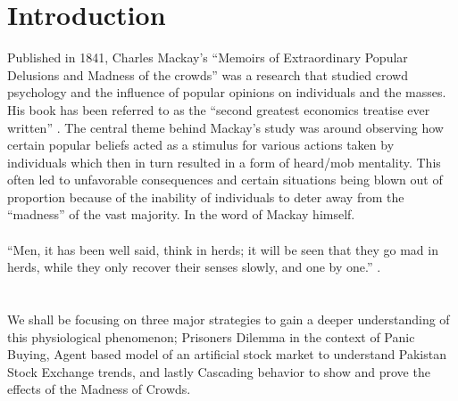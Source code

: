 \documentclass[runningheads]{llncs}
\begin{document}


\section{Introduction}

Published in 1841, Charles Mackay’s “Memoirs of Extraordinary Popular Delusions and Madness of the crowds” was a research that studied crowd psychology and the influence of popular opinions on individuals and the masses. His book has been referred to as the “second greatest economics treatise ever written” \cite{ref_lncs7}. The central theme behind Mackay’s study was around observing how certain popular beliefs acted as a stimulus for various actions taken by individuals which then in turn resulted in a form of heard/mob mentality. This often led to unfavorable consequences and certain situations being blown out of proportion because of the inability of individuals to deter away from the “madness” of the vast majority. In the word of Mackay himself.\\
\\
“Men, it has been well said, think in herds; it will be seen that they go mad in herds, while they only recover their senses slowly, and one by one.” \cite{ref_lncs6}.\\
\\
\\
We shall be focusing on three major strategies to gain a deeper understanding of this physiological phenomenon; Prisoners Dilemma in the context of Panic Buying, Agent based model of an artificial stock market to understand Pakistan Stock Exchange trends, and lastly Cascading behavior to show and prove the effects of the Madness of Crowds.
\end{document}

